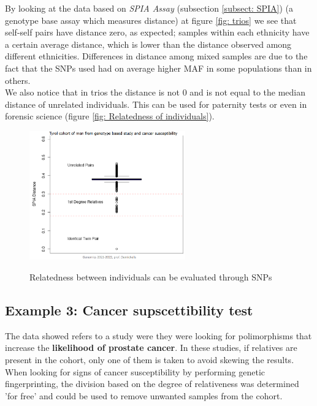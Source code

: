 By looking at the data based on \textit{SPIA Assay} (subsection \ref{subsect:
SPIA}) (a genotype base assay which measures distance) at figure \ref{fig:
trios} we see that self-self pairs have distance zero, as expected; samples
within each ethnicity have a certain average distance, which is lower than the
distance observed among different ethnicities. Differences in distance among
mixed samples are due to the fact that the SNPs used had on average higher MAF
in some populations than in others. \\
\noindent We also notice that in trios the distance is not 0 and is not equal to
the median distance of unrelated individuals. This can be used for paternity
tests or even in forensic science (figure \ref*{fig: Relatedness of
individuals}).

\begin{figure}[ht]
  \caption{Relatedness between individuals can be evaluated through SNPs}
  \centering
  \includegraphics[width=0.60\textwidth]{IndividualsRelatedness.PNG}
  \label{fig: Relatedness of individuals}
\end{figure}


\subsection{Example 3: Cancer supscettibility test}
The data showed refers to a study were they were looking for polimorphisms that
increase the \textbf{likelihood of prostate cancer}. In these studies, if
relatives are present in the cohort, only one of them is taken to avoid skewing
the results. When looking for signs of cancer susceptibility by performing
genetic fingerprinting, the division based on the degree of relativeness was
determined 'for free' and could be used to remove unwanted samples from the
cohort.


